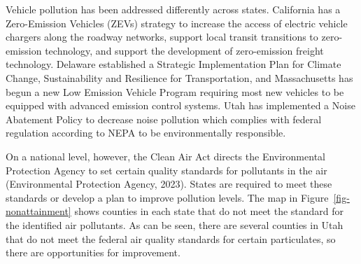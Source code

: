\documentclass[
  letterpaper,
  authoryear,
  review,
  3p]{elsarticle}
\begin{document}
Vehicle pollution has been addressed differently across states.
California has a Zero-Emission Vehicles (ZEVs) strategy to increase the
access of electric vehicle chargers along the roadway networks, support
local transit transitions to zero-emission technology, and support the
development of zero-emission freight technology. Delaware established a
Strategic Implementation Plan for Climate Change, Sustainability and
Resilience for Transportation, and Massachusetts has begun a new Low
Emission Vehicle Program requiring most new vehicles to be equipped with
advanced emission control systems. Utah has implemented a Noise
Abatement Policy to decrease noise pollution which complies with federal
regulation according to NEPA to be environmentally responsible.

On a national level, however, the Clean Air Act directs the
Environmental Protection Agency to set certain quality standards for
pollutants in the air (Environmental Protection Agency, 2023). States
are required to meet these standards or develop a plan to improve
pollution levels. The map in Figure~\ref{fig-nonattainment} shows
counties in each state that do not meet the standard for the identified
air pollutants. As can be seen, there are several counties in Utah that
do not meet the federal air quality standards for certain particulates,
so there are opportunities for improvement.
\end{document}
